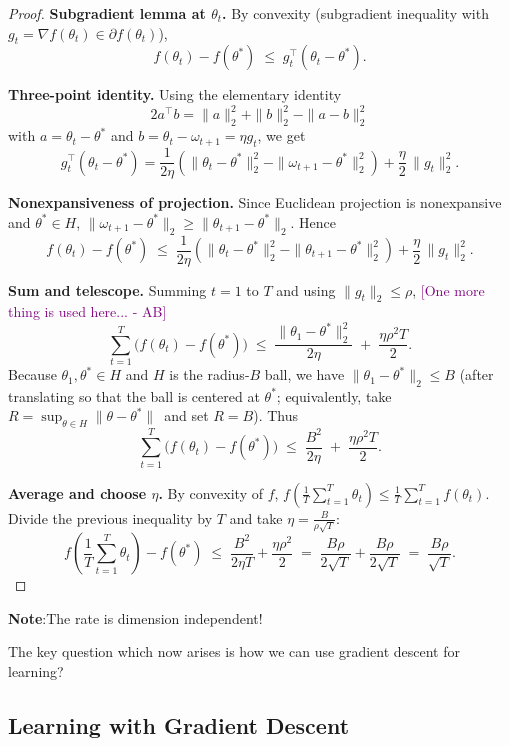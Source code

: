 \documentclass[11pt]{article}
\newcommand{\ab}[1]{\textcolor{purple}{[#1 - AB]}}
\theoremstyle{plain}
\begin{document}
\begin{proof}
\textbf{Subgradient lemma at $\theta_t$.}
By convexity (subgradient inequality with $g_t=\nabla f(\theta_t)\in\partial f(\theta_t)$),
\[
f(\theta_t)-f(\theta^*) \;\le\; g_t^{\top}(\theta_t-\theta^*).
\]

\textbf{Three-point identity.}
Using the elementary identity
\[
2a^{\top}b=\|a\|_2^2+\|b\|_2^2-\|a-b\|_2^2
\]
with $a=\theta_t-\theta^*$ and $b=\theta_t-\omega_{t+1}=\eta g_t$, we get
\[
g_t^{\top}(\theta_t-\theta^*)
=\frac{1}{2\eta}\!\left(\|\theta_t-\theta^*\|_2^2-\|\omega_{t+1}-\theta^*\|_2^2\right)
+\frac{\eta}{2}\,\|g_t\|_2^2.
\]

\textbf{Nonexpansiveness of projection.}
Since Euclidean projection is nonexpansive and $\theta^*\in H$,
\(
\|\omega_{t+1}-\theta^*\|_2 \ge \|\theta_{t+1}-\theta^*\|_2.
\)
Hence
\[
f(\theta_t)-f(\theta^*) \;\le\;
\frac{1}{2\eta}\!\left(\|\theta_t-\theta^*\|_2^2-\|\theta_{t+1}-\theta^*\|_2^2\right)
+\frac{\eta}{2}\,\|g_t\|_2^2.
\]

\textbf{Sum and telescope.}
Summing $t=1$ to $T$ and using $\|g_t\|_2\le \rho$, \ab{One more thing is used here...}
\[
\sum_{t=1}^T \bigl(f(\theta_t)-f(\theta^*)\bigr)
\;\le\; \frac{\|\theta_1-\theta^*\|_2^2}{2\eta} \;+\; \frac{\eta\rho^2 T}{2}.
\]
Because $\theta_1,\theta^*\in H$ and $H$ is the radius-$B$ ball, we have $\|\theta_1-\theta^*\|_2\le B$ (after translating so that the ball is centered at $\theta^*$; equivalently, take $R=\sup_{\theta\in H}\|\theta-\theta^*\|\,$ and set $R=B$). Thus
\[
\sum_{t=1}^T \bigl(f(\theta_t)-f(\theta^*)\bigr)
\;\le\; \frac{B^2}{2\eta} \;+\; \frac{\eta\rho^2 T}{2}.
\]

\textbf{Average and choose $\eta$.}
By convexity of $f$,
\(
f\!\left(\frac1T\sum_{t=1}^T\theta_t\right)\le \frac1T\sum_{t=1}^T f(\theta_t).
\)
Divide the previous inequality by $T$ and take
\(\eta=\frac{B}{\rho\sqrt{T}}\):
\[
f\!\left(\frac1T\sum_{t=1}^T\theta_t\right)-f(\theta^*)
\;\le\; \frac{B^2}{2\eta T}+\frac{\eta\rho^2}{2}
\;=\; \frac{B\rho}{2\sqrt{T}}+\frac{B\rho}{2\sqrt{T}}
\;=\; \frac{B\rho}{\sqrt{T}}.
\]
\end{proof}

\textbf{Note}:The rate is dimension independent!

The key question which now arises is how we can use gradient descent for learning?

\subsection{Learning with Gradient Descent}
\end{document}
